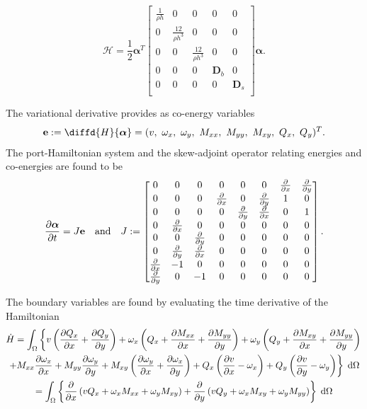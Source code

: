 \documentclass[preprint,12pt]{elsarticle}
\begin{document}
\begin{equation}
\label{eq:H_min}
\mathcal{H} = \frac{1}{2} \bm{\alpha}^T \begin{bmatrix}
\frac{1}{\rho h} & 0 & 0 & 0 & 0 \\
0 & \frac{12}{\rho h^3} & 0 & 0 & 0 \\
0 & 0 & \frac{12}{\rho h^3} & 0 & 0 \\
0 & 0 & 0 & \bm{D}_b & 0 \\
0 & 0 & 0 &  0 & \bm{D}_s \\
\end{bmatrix} \bm{\alpha}.
\end{equation}

The variational derivative provides as co-energy variables
\begin{equation}
\mathbf{e} := \diffd{H}{\bm{\alpha}} = (v,\ \omega_x, \ \omega_y,\ M_{xx},\ M_{yy},\ M_{xy},\ Q_x, \ Q_y)^T.
\end{equation}
The port-Hamiltonian system and the skew-adjoint operator relating energies and co-energies are found to be
\begin{equation}
\label{eq:PH_Min}
\diffp{\bm{\alpha}}{t} = J \mathbf{e}  	\quad \text{and} \quad
J := 
\begin{bmatrix}
0 & 0 & 0 & 0 & 0 & 0 & \diffp{}{x} & \diffp{}{y} \\
0 & 0 & 0 & \diffp{}{x} & 0 & \diffp{}{y} & 1 & 0 \\
0 & 0 & 0 & 0 & \diffp{}{y} & \diffp{}{x} & 0 & 1 \\
0 & \diffp{}{x} & 0 & 0 & 0 & 0 & 0 & 0\\
0 & 0 & \diffp{}{y} & 0 & 0 & 0 & 0 & 0\\
0 & \diffp{}{y} & \diffp{}{x} & 0 & 0 & 0 & 0 & 0\\
\diffp{}{x} & -1 & 0 & 0 & 0 & 0 & 0 & 0\\
\diffp{}{y} & 0 & -1 & 0 & 0 & 0 & 0 & 0\\
\end{bmatrix}.
\end{equation}

The boundary variables are found by evaluating the time derivative of the Hamiltonian
\begin{multline*}
\dot{H} = \int_\Omega\left\{v \left(\diffp{Q_x}{x} + \diffp{Q_y}{y}\right) + \omega_x \left(Q_x + \diffp{M_{xx}}{x} + \diffp{M_{yy}}{y} \right) + \omega_y \left(Q_y + \diffp{M_{xy}}{x} + \diffp{M_{yy}}{y} \right) \right. \\
\left.  + M_{xx} \diffp{\omega_x}{x} + M_{yy} \diffp{\omega_y}{y} + M_{xy} \left(\diffp{\omega_y}{x} + \diffp{\omega_x}{y} \right) + Q_x \left(\diffp{v}{x} -\omega_x \right) + Q_y \left(\diffp{v}{y} -\omega_y \right)  \right\} \d\Omega  \\
= \int_\Omega \left\{\diffp{}{x}\left(v Q_x + \omega_x M_{xx} + \omega_y M_{xy} \right) + \diffp{}{y}\left(v Q_y + \omega_x M_{xy} + \omega_y M_{yy} \right)  \right\} \d\Omega
\end{multline*}
\end{document}
